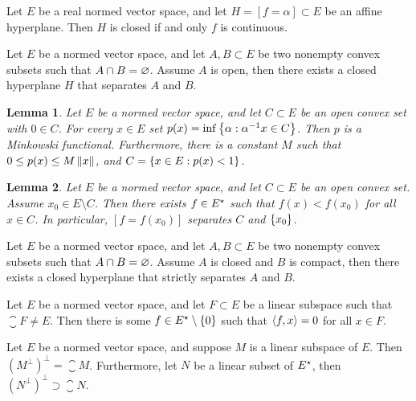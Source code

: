 \documentclass[11pt]{article}
\theoremstyle{plain}
\newtheorem{lemma}{Lemma}[section]
\begin{document}
\begin{proposition}
    Let $E$ be a real normed vector space, and let $H=[f=\alpha]\subset E$ be an affine hyperplane. Then $H$ is closed if and only $f$ is continuous.
\end{proposition}

\begin{theorem}
    Let $E$ be a normed vector space, and let $A,B\subset E$ be two nonempty convex subsets such that $A\cap B = \varnothing$. Assume $A$ is open, then there exists a closed hyperplane $H$ that separates $A$ and $B$.
\end{theorem}

\begin{lemma}
    Let $E$ be a normed vector space, and let $C\subset E$ be an open convex set with $0\in C$. For every $x\in E$ set $p(x)= \inf \left\{\alpha : \alpha^{-1}x\in C\right\}$. Then $p$ is a Minkowski functional. Furthermore, there is a constant $M$ such that $0\leq p(x)\leq M\left\lVert x\right\rVert$, and $C = \left\{x\in E: p(x)<1\right\}$.
\end{lemma}

\begin{lemma}
    Let $E$ be a normed vector space, and let $C\subset E$ be an open convex set. Assume $x_0\in E\setminus C$. Then there exists $f\in E{}^{\star}$ such that $f(x)< f(x_0)$ for all $x\in C$. In particular, $[f=f(x_0)]$ separates $C$ and $\left\{x_0\right\}$.
\end{lemma}

\begin{theorem}
    Let $E$ be a normed vector space, and let $A,B\subset E$ be two nonempty convex subsets such that $A\cap B = \varnothing$. Assume $A$ is closed and $B$ is compact, then there exists a closed hyperplane that strictly separates $A$ and $B$.
\end{theorem}

\begin{corollary}
    Let $E$ be a normed vector space, and let $F\subset E$ be a linear subspace such that $\closure{F}\neq E$. Then there  is some $f\in E{}^{\star}\setminus\left\{0\right\}$ such that $\left\langle f, x\right\rangle = 0$ for all $x\in F$. 
\end{corollary}

\begin{proposition}
    Let $E$ be a normed vector space, and suppose $M$ is a linear subspace of $E$. Then $(M^\perp)^\perp = \closure{M}$. Furthermore, let $N$ be a linear subset of $E{}^{\star}$, then $(N^\perp)^\perp \supset \closure{N}$.
\end{proposition}
\end{document}
